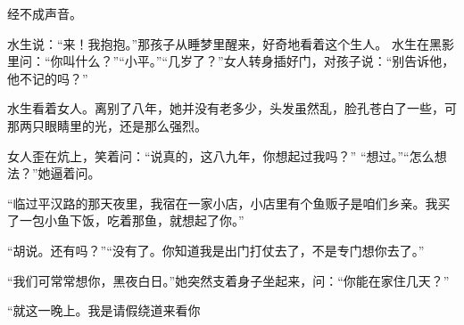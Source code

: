 \documentclass{ctexart}
\renewcommand{\\}{\par}
\begin{document}
经不成声音。\\水生说：“来！我抱抱。”那孩子从睡梦里醒来，好奇地看着这个生人。 水生在黑影里问：“你叫什么？”“小平。”“几岁了？”女人转身插好门，对孩子说：“别告诉他，他不记的吗？”\\水生看着女人。离别了八年，她并没有老多少，头发虽然乱，脸孔苍白了一些，可那两只眼睛里的光，还是那么强烈。\\女人歪在炕上，笑着问：“说真的，这八九年，你想起过我吗？” “想过。”“怎么想法？”她逼着问。\\“临过平汉路的那天夜里，我宿在一家小店，小店里有个鱼贩子是咱们乡亲。我买了一包小鱼下饭，吃着那鱼，就想起了你。”\\“胡说。还有吗？”“没有了。你知道我是出门打仗去了，不是专门想你去了。”\\“我们可常常想你，黑夜白日。”她突然支着身子坐起来，问：“你能在家住几天？”\\“就这一晚上。我是请假绕道来看你
\end{document}

